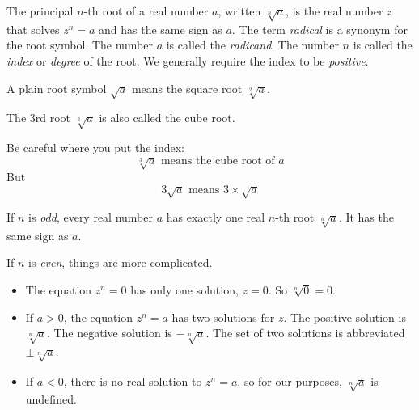 \label{sec:roots-frac-exp}


The principal $n$-th root of a real number $a$, written
$\sqrt[n]{a}$,
is the real number $z$ that solves
$z^n = a$ and has the same sign as $a$.
The term \emph{radical} is a synonym for the root symbol.
The number $a$ is called the \emph{radicand}.
The number $n$ is called the \emph{index} or \emph{degree} of the root.
We generally require the index to be \emph{positive}.

A plain root symbol $\sqrt{a}$ means the square root $\sqrt[2]{a}$.

The 3rd root $\sqrt[3]{a}$ is also called the cube root.

Be careful where you put the index:
\begin{equation*}
 \sqrt[3]{a} \text{ means the cube root of $a$}
\end{equation*}
But
\begin{equation*}
 3 \sqrt{a} \text{ means } 3 \times \sqrt{a}
\end{equation*}


If $n$ is \emph{odd}, every real number $a$ has exactly one real $n$-th root $\sqrt[n]{a}$.
It has the same sign as $a$.


If $n$ is \emph{even}, things are more complicated.
\begin{itemize}
\item The equation $z^n = 0$ has only one solution, $z = 0$.
 So $\sqrt[n]{0} = 0$.

\item If $a > 0$, the equation $z^n = a$ has two solutions for $z$.
 The positive solution is $\sqrt[n]{a}$.
 The negative solution is $-\sqrt[n]{a}$.
 The set of two solutions is abbreviated $\pm \sqrt[n]{a}$.

\item If $a < 0$, there is no real solution to $z^n = a$, so for our purposes, $\sqrt[n]{a}$ is undefined.
\end{itemize}

